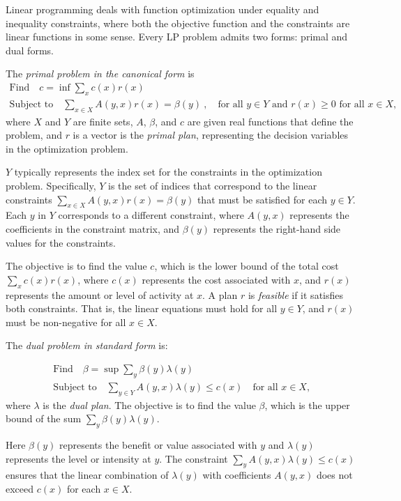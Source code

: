 \documentclass[axioms,article,submit,pdftex,moreauthors]{Definitions/mdpi}
\theoremstyle{plain}
\theoremstyle{remark}
\begin{document}
Linear programming deals with function optimization under equality and inequality constraints, where both the objective function and the constraints are linear functions in some sense. Every LP problem admits two forms: primal and dual forms.

The \emph{primal problem in the canonical form} is
\begin{gather*} 
\text{Find}\quad  c = \inf \sum_x c(x) r(x) \\
\text{Subject to}\quad 
\sum_{x \in X} A(y, x) r(x) = \beta(y) \ , \quad \text{for all $y \in Y$ and 
$r(x) \geq 0$ for all $x \in X$,}
\end{gather*} 
where $X$ and $Y$ are finite sets, $A$, $\beta$, and $c$ are given real functions that define the problem, and \( r \) is a vector is the \emph{primal plan}, representing the decision variables in the optimization problem. 

\( Y \) typically represents the index set for the constraints in the optimization problem. Specifically, \( Y \) is the set of indices that correspond to the linear constraints \( \sum_{x \in X} A(y, x) r(x) = \beta(y) \) that must be satisfied for each \( y \in Y \). Each \( y \) in \( Y \) corresponds to a different constraint, where \( A(y, x) \) represents the coefficients in the constraint matrix, and \( \beta(y) \) represents the right-hand side values for the constraints.

The objective is to find the value \( c \), which is the lower bound of the total cost \( \sum_x c(x) r(x) \), where \( c(x) \) represents the cost associated with \( x \), and \( r(x) \) represents the amount or level of activity at \( x \).
 A plan \( r \) is \emph{feasible} if it satisfies both constraints. That is, the linear equations must hold for all \( y \in Y \), and \( r(x) \) must be non-negative for all \( x \in X\).

The \emph{dual problem in standard form} is:

\begin{gather*} 
\text{Find}\quad \beta = \sup \sum_y \beta(y) \lambda(y) \\
\text{Subject to} \quad 
\sum_{y\in Y} A(y, x) \lambda(y) \leq c(x) \quad \text{for all $x \in X$,}
\end{gather*} 
where \( \lambda \) is the \emph{dual plan}. The objective is to find the value \( \beta \), which is the upper bound of the sum \( \sum_y \beta(y) \lambda(y) \). 

Here \( \beta(y) \) represents the benefit or value associated with \( y \) and \( \lambda(y) \) represents the level or intensity at \( y \). The constraint \( \sum_y A(y, x) \lambda(y) \leq c(x) \) ensures that the linear combination of \( \lambda(y) \) with coefficients \( A(y, x) \) does not exceed \( c(x) \) for each \( x \in X\).
\end{document}
